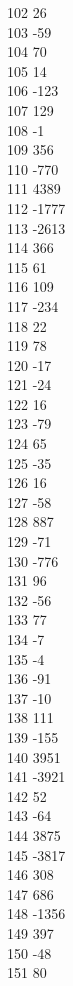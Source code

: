 { 102	26 \\
 103	-59 \\
 104	70 \\
 105	14 \\
 106	-123 \\
 107	129 \\
 108	-1 \\
 109	356 \\
 110	-770 \\
 111	4389 \\
 112	-1777 \\
 113	-2613 \\
 114	366 \\
 115	61 \\
 116	109 \\
 117	-234 \\
 118	22 \\
 119	78 \\
 120	-17 \\
 121	-24 \\
 122	16 \\
 123	-79 \\
 124	65 \\
 125	-35 \\
 126	16 \\
 127	-58 \\
 128	887 \\
 129	-71 \\
 130	-776 \\
 131	96 \\
 132	-56 \\
 133	77 \\
 134	-7 \\
 135	-4 \\
 136	-91 \\
 137	-10 \\
 138	111 \\
 139	-155 \\
 140	3951 \\
 141	-3921 \\
 142	52 \\
 143	-64 \\
 144	3875 \\
 145	-3817 \\
 146	308 \\
 147	686 \\
 148	-1356 \\
 149	397 \\
 150	-48 \\
 151	80 \\
}
